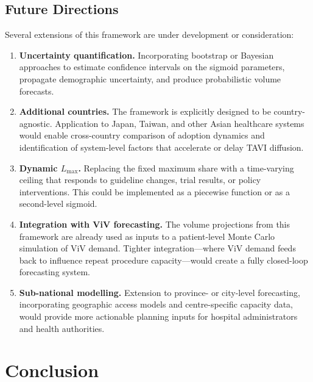 \documentclass[12pt, a4paper]{article}
\begin{document}
\subsection{Future Directions}

Several extensions of this framework are under development or consideration:

\begin{enumerate}[leftmargin=*, itemsep=4pt]
    \item \textbf{Uncertainty quantification.} Incorporating bootstrap or Bayesian approaches to estimate confidence intervals on the sigmoid parameters, propagate demographic uncertainty, and produce probabilistic volume forecasts.

    \item \textbf{Additional countries.} The framework is explicitly designed to be country-agnostic. Application to Japan, Taiwan, and other Asian healthcare systems would enable cross-country comparison of adoption dynamics and identification of system-level factors that accelerate or delay TAVI diffusion.

    \item \textbf{Dynamic $L_{\max}$.} Replacing the fixed maximum share with a time-varying ceiling that responds to guideline changes, trial results, or policy interventions. This could be implemented as a piecewise function or as a second-level sigmoid.

    \item \textbf{Integration with ViV forecasting.} The volume projections from this framework are already used as inputs to a patient-level Monte Carlo simulation of ViV demand. Tighter integration---where ViV demand feeds back to influence repeat procedure capacity---would create a fully closed-loop forecasting system.

    \item \textbf{Sub-national modelling.} Extension to province- or city-level forecasting, incorporating geographic access models and centre-specific capacity data, would provide more actionable planning inputs for hospital administrators and health authorities.
\end{enumerate}


\section{Conclusion}
\end{document}

